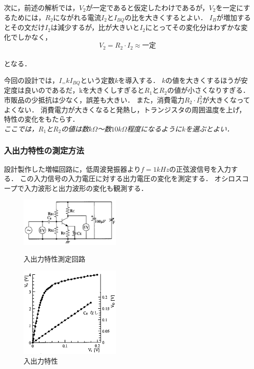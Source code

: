 \documentclass[10pt, a4j, dvipdfmx]{jarticle}
\begin{document}
    次に，前述の解析では，$V_2$が一定であると仮定したわけであるが，$V_2$を一定にするためには，$R_2$にながれる電流$I_2$と$I_{BQ}$の比を大きくするとよい．
    $I_B$が増加するとその文だけ$I_2$は減少するが，比が大きいと$I_2$にとってその変化分はわずかな変化でしかなく，
    \begin{equation}
        V_2 = R_2 \cdot I_2 \approx 一定
    \end{equation}\\
    となる．

    今回の設計では，$I_ = k I_{BQ}$という定数$k$を導入する．
    $k$の値を大きくするほうが安定度は良いのであるだ，kを大きくしすぎると$R_1$と$R_2$の値が小さくなりすぎる．
    市販品の少抵抗は少なく，誤差も大きい．
    また，消費電力$R_2 \cdot I_2^2$が大きくなってよくない．
    消費電力が大きくなると発熱し，トランジスタの周囲温度を上げ，特性の変化をもたらす．\\
    \emph{ここでは，$R_1$と$R_2$の値は数$k\Omega$〜数$10k\Omega$程度になるように$k$を選ぶとよい．}

    \newpage
    \subsubsection{入出力特性の測定方法}
    設計製作した増幅回路に，低周波発振器より$f = 1kHz$の正弦波信号を入力する．
    この入力信号の入力電圧に対する出力電圧の変化を測定する．
    オシロスコープで入力波形と出力波形の変化も観測する．
    \begin{figure}[H]
        \begin{minipage}{0.5\hsize}
            \centering
            \includegraphics[width=50mm]{fig-13.png}
            \caption{入出力特性測定回路}
            \label{fig:12}
        \end{minipage}
        \begin{minipage}{0.5\hsize}
            \centering
            \includegraphics[height=45mm]{fig-14.png}
            \caption{入出力特性}
            \label{fig:13}
        \end{minipage}
    \end{figure}
\end{document}
